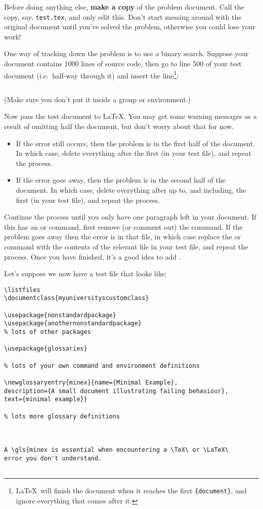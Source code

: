 Before doing anything else, \textbf{make a copy} of the problem document.
Call the copy, say, \texttt{test.tex}, and only edit this. Don't start
messing around with the original document until you've solved the
problem, otherwise you could lose your work! 

One way of tracking down the problem is to use a binary search.
Suppose your document contains 1000 lines of source code, then go to
line 500 of your test document (i.e.\ half-way through it) and insert
the line\footnote{\LaTeX\ will finish the document when it reaches the
first \texttt{\{document\}}, and ignore everything that comes after it.}:
\begin{verbatim}

\end{verbatim}
(Make sure you don't put it inside a group or environment.)

Now pass the test document to LaTeX. You may get some warning
messages as a result of omitting half the document, but don't worry
about that for now.
\begin{itemize}
 \item If the error still occurs, then the problem is in the first
half of the document. In which case, delete everything after the
first \verb|| (in your test file), and repeat the process. 

 \item If the error goes away, then the problem is in the second
half of the document. In which case, delete everything after
\verb|| up to, and including, the first
\verb|| (in your test file), and repeat the process. 
\end{itemize}

Continue the process until you only have one paragraph left in your
document. If this has an  or  command, first
remove (or comment out) the command. If the problem goes away then
the error is in that file, in which case replace the  or
 command with the contents of the relevant file in your
test file, and repeat the process. Once you have finished, it's a
good idea to add . 

Let's suppose we now have a test file that looks like:
\begin{verbatim}
\listfiles
\documentclass{myuniversityscustomclass}

\usepackage{nonstandardpackage}
\usepackage{anothernonstandardpackage}
% lots of other packages

\usepackage{glossaries}

% lots of your own command and environment definitions

\newglossaryentry{minex}{name={Minimal Example},
description={A small document illustrating failing behaviour},
text={minimal example}}

% lots more glossary definitions



A \gls{minex is essential when encountering a \TeX\ or \LaTeX\ 
error you don't understand.


\end{verbatim}

